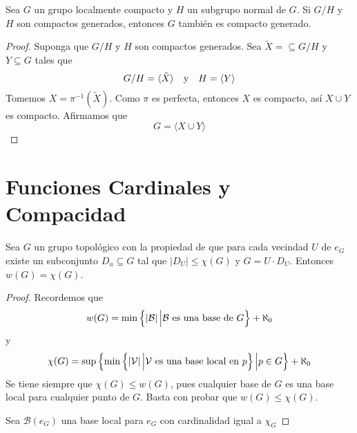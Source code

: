 \documentclass[12pt]{report}
\theoremstyle{largebreak}
\newcommand\abs[1]{\ensuremath{\left|#1\right|}}
\newcommand{\gen}[1]{\ensuremath{\langle#1\rangle}}
\begin{document}
    \begin{theor}
        Sea $G$ un grupo localmente compacto y $H$ un subgrupo normal de $G$. Si $G/H$ y $H$ son compactos generados, entonces $G$ también es compacto generado.
    \end{theor}

    \begin{proof}
        Suponga que $G/H$ y $H$ son compactos generados. Sea $\tilde{X}=\subseteq G/H$ y $Y\subseteq G$ tales que
        \begin{equation*}
            G/H=\gen{\tilde{X}}\quad\textup{y}\quad H=\gen{Y}
        \end{equation*}
        Tomemos $X=\pi^{-1}(\tilde{X})$. Como $\pi$ es perfecta, entonces $X$ es compacto, así $X\cup Y$ es compacto. Afirmamos que
        \begin{equation*}
            G=\gen{X\cup Y}
        \end{equation*}
    \end{proof}

    \section{Funciones Cardinales y Compacidad}

    \begin{theor}
            Sea $G$ un grupo topológico con la propiedad de que para cada vecindad $U$ de $e_G$ existe un subconjunto $D_u\subseteq G$ tal que $\abs{D_U}\leq\chi(G)$ y $G=U\cdot D_U$. Entonces $w(G)=\chi(G)$.
    \end{theor}

    \begin{proof}
        Recordemos que
        \begin{equation*}
            w(G)=\min\left\{\abs{\mathcal{B}}\Big|\mathcal{B}\textup{ es una base de }G \right\}+\aleph_0
        \end{equation*}
        y
        \begin{equation*}
            \chi(G)=\sup\left\{\min\left\{\abs{\mathcal{V}}\Big|\mathcal{V}\textup{ es una base local en }p \right\}\Big|p\in G \right\}+\aleph_0
        \end{equation*}
        Se tiene siempre que $\chi(G)\leq w(G)$, pues cualquier base de $G$ es una base local para cualquier punto de $G$. Basta con probar que $w(G)\leq\chi(G)$.

        Sea $\mathcal{B}(e_G)$ una base local para $e_G$ con cardinalidad igual a $\chi_G$
    \end{proof}
\end{document}
